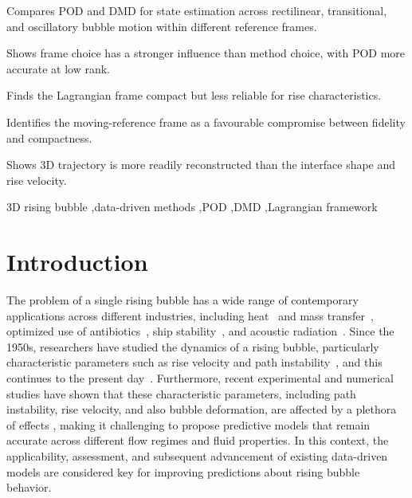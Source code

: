 \documentclass[a4paper,fleqn]{cas-sc}
\begin{document}
	\begin{highlights}
		\item Compares POD and DMD for state estimation across rectilinear, transitional, and oscillatory bubble motion within different reference frames.
		\item Shows frame choice has a stronger influence than method choice, with POD more accurate at low rank.
		\item Finds the Lagrangian frame compact but less reliable for rise characteristics.
		\item Identifies the moving-reference frame as a favourable compromise between fidelity and compactness.
		\item Shows 3D trajectory is more readily reconstructed than the interface shape and rise velocity.
	\end{highlights}
	
	\begin{keywords}
		3D rising bubble \sep data-driven methods \sep POD \sep DMD \sep Lagrangian framework
	\end{keywords}

	\maketitle
	\linenumbers
	

	\section{Introduction}
	\label{Introduction}
	
	The problem of a single rising bubble has a wide range of contemporary applications across different industries, including heat~\cite{Larimi2018} and mass transfer~\cite{Kentheswaran2023}, optimized use of antibiotics~\cite{Hamdollahi2022}, ship stability~\cite{Fang2022}, and acoustic radiation~\cite{Ouyang2021}. Since the 1950s, researchers have studied the dynamics of a rising bubble, particularly characteristic parameters such as rise velocity and path instability~\cite{Saffman1956,TSUGE1977,Duineveld1995}, and this continues to the present day~\cite{Shi2024,Bonnefis2024,Hosen2024}. Furthermore, recent experimental and numerical studies have shown that these characteristic parameters, including path instability, rise velocity, and also bubble deformation, are affected by a plethora of effects \cite{Liu2006,Cano-Lozano2016,Kure2021}, making it challenging to propose predictive models that remain accurate across different flow regimes and fluid properties. In this context, the applicability, assessment, and subsequent advancement of existing data-driven models are considered key for improving predictions about rising bubble behavior.
	
\end{document}
